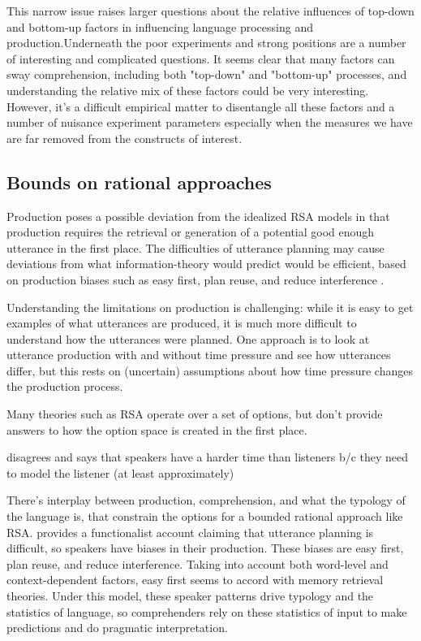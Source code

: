 \documentclass[]{article}
\begin{document}
 This narrow issue raises larger questions about the relative influences of top-down and bottom-up factors in influencing language processing and production.Underneath the poor experiments and strong positions are a number of interesting and complicated questions. It seems clear that many factors can sway comprehension, including both "top-down" and "bottom-up" processes, and understanding the relative mix of these factors could be very interesting. However, it's a difficult empirical matter to disentangle all these factors and a number of nuisance experiment parameters especially when the measures we have are far removed from the constructs of interest. 

\subsection{Bounds on rational approaches}
Production poses a possible deviation from the idealized RSA models in that production requires the retrieval or generation of a potential good enough utterance in the first place. The difficulties of utterance planning may cause deviations from what information-theory would predict would be efficient, based on production biases such as easy first, plan reuse, and reduce interference \cite{macdonald2013}. 

Understanding the limitations on production is challenging: while it is easy to get examples of what utterances are produced, it is much more difficult to understand how the utterances were planned. One approach is to look at utterance production with and without time pressure and see how utterances differ, but this rests on (uncertain) assumptions about how time pressure changes the production process. 

Many theories such as RSA operate over a set of options, but don't provide answers to how the option space is created in the first place. 

\cite{heller2012} disagrees and says that speakers have a harder time than listeners b/c they need to model the listener (at least approximately) %

There's interplay between production, comprehension, and what the typology of the language is, that constrain the options for a bounded rational approach like RSA. \cite{macdonald2013} provides a functionalist account claiming that utterance planning is difficult, so speakers have biases in their production. These biases are easy first, plan reuse, and reduce interference. Taking into account both word-level and context-dependent factors, easy first seems to accord with memory retrieval theories. %
Under this model, these speaker patterns drive typology and the statistics of language, so comprehenders rely on these statistics of input to make predictions and do pragmatic interpretation. 
\end{document}
